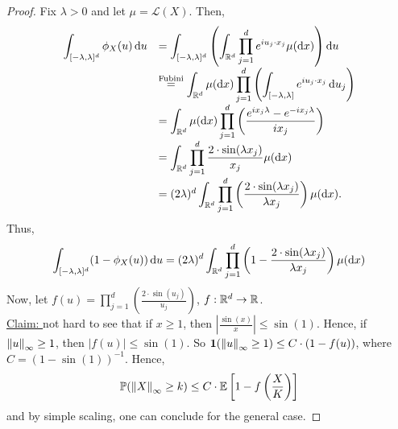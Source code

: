 \documentclass{article}
\begin{document}
\begin{proof}
    Fix $ \lambda>0$ and let $ \mu = \mathcal{L}(X)$. Then,
    \[
    \begin{array}{ll}
	    \displaystyle\int_{[-\lambda, \lambda]^{d}}\phi_{X}(u) \diff u   &= 
 \displaystyle\int_{[-\lambda, \lambda]^{d}} \left( \displaystyle\int_{\R^{d}} \prod^d_{j=1}e^{iu_{j}\cdot x_{j}}\mu(\diff x)   \right) \diff   u \\
									     &\stackrel{\text{Fubini}}{=} \displaystyle\int_{\R^{d}} \mu(\diff  x) \displaystyle\prod^d_{j=1} \left( \displaystyle\int_{[-\lambda,\lambda]}e^{iu_{j}\cdot x_{j}} \diff u_{j} \right) \\ 
									     &= \displaystyle\int_{\R^{d}} \mu(\diff  x) \displaystyle\prod^d_{j=1} \left( \frac{e^{ix_{j}\lambda}-e^{-ix_{j}\lambda}}{ix_{j}} \right) \\ 
									     &= \displaystyle\int_{\R^{d}}\displaystyle\prod^d_{j=1} \frac{2\cdot \sin(\lambda x_{j})}{x_{j}} \mu( \diff  x)\\ 
									     & = (2\lambda)^{d}\displaystyle\int_{\R^{d}}\displaystyle\prod^d_{j=1} \left(\frac{2\cdot \sin(\lambda x_{j})}{\lambda x_{j}}\right) \mu( \diff  x).

    \end{array}
    \]
     Thus, 
     \[
     \displaystyle\int_{[-\lambda, \lambda]^{d}}(1-\phi_{X}(u)) \operatorname{d}\! u  = (2\lambda)^{d}\displaystyle\int_{\mathbb{R}^{d}}\displaystyle\prod^d_{j=1} \left(1- \frac{2\cdot \sin(\lambda x_{j})}{\lambda x_{j}}\right) \mu( \operatorname{d}\!  x)
\]
     Now, let $ f(u) = \displaystyle\prod^d_{j=1} \left(\frac{2\cdot \sin(u_{j})}{u_{j}}\right)$, $ f:\mathbb{R}^{d}\to \mathbb{R}$. \\ 
	     \underline{Claim: } not hard to see that if $ x\geq 1$, then $ \left| \frac{\sin(x)}{x} \right|\leq \sin(1)$. Hence, if $ \left\lVert u\right\rVert_{\infty}\geq 1$, then $ |f(u)|\leq \sin(1)$. So $ \mathbf{1}(\left\lVert u\right\rVert_{\infty}\geq 1)\leq C\cdot(1-f(u))$, where $ C = (1-\sin(1))^{-1}$. Hence, 
	     \[
		     \mathbb{P}(\left\lVert X\right\rVert_{\infty}\geq k)\leq C\cdot \mathbb{E}\left[ 1- f \left( \frac{X}{K} \right) \right]
	     \]
and by simple scaling, one can conclude for the general case.
\end{proof}
\end{document}
